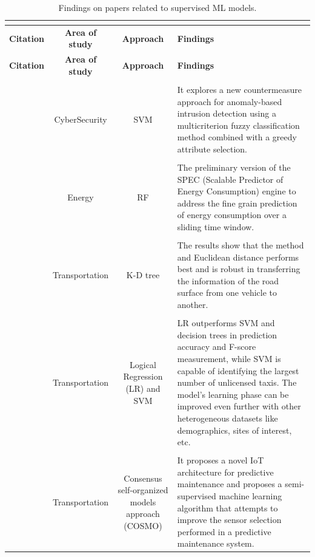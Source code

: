 \documentclass[a4paper,12pt,twoside]{ThesisStyle}
\begin{document}
\renewcommand{\arraystretch}{1.5}
\begin{landscape}
\begin{longtable}{  l  c  c  l  }
\caption{Findings on papers related to supervised ML models.}  \\
\label{taula:PSMLM}  \\
 \hline
  \textbf{Citation} & \textbf{Area of study} & \textbf{Approach} & \textbf{Findings}  \\
\hline 
\endfirsthead
 \hline
  \textbf{Citation} & \textbf{Area of study} & \textbf{Approach} & \textbf{Findings}  \\
\hline 
\endhead
\hline
\endfoot
\\
\parbox{1.5cm}{~\cite{el2014multicriterion}}  & CyberSecurity & SVM & \parbox{12cm}{It explores a new countermeasure approach for anomaly-based intrusion detection using a multicriterion fuzzy classification method combined with a greedy attribute selection.} \\
\\
\parbox{1.5cm}{~\cite{cerquitelli2017predicting}}  & Energy & RF & \parbox{12cm}{The preliminary version of the SPEC (Scalable Predictor of Energy Consumption) engine to address the fine grain prediction of energy consumption over a sliding time window.} \\
\\
\parbox{1.5cm}{~\cite{masino2017learning}} & Transportation & K-D tree & \parbox{12cm}{The results show that the method and Euclidean distance performs best and is robust in transferring the information of the road surface from one vehicle to another.} \\
\\
\parbox{1cm}{~\cite{Wang2017Taxis}}  & \parbox{2.5cm}{Transportation} & \parbox{2.2cm}{Logical Regression (LR) and SVM} & \parbox{12cm}{LR outperforms SVM and decision trees in prediction accuracy and F-score measurement, while SVM is capable of identifying the largest number of unlicensed taxis. The model's learning phase can be improved even further with other heterogeneous datasets like demographics, sites of interest, etc.} \\
\\
\parbox{1cm}{~\cite{killeen2019iot}}  & Transportation & \parbox{3cm}{Consensus self-organized models approach (COSMO)} & \parbox{12cm}{It proposes a novel IoT architecture for predictive maintenance and proposes a semi-supervised machine learning algorithm that attempts to improve the sensor selection performed in a predictive maintenance system.} \\

\end{longtable}
\end{landscape}
\end{document}
